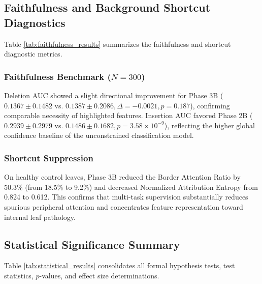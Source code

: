 \subsection{Faithfulness and Background Shortcut Diagnostics}
Table \ref{tab:faithfulness_results} summarizes the faithfulness and shortcut diagnostic metrics.

\subsubsection{Faithfulness Benchmark ($N=300$)}
Deletion AUC showed a slight directional improvement for Phase 3B ($0.1367 \pm 0.1482$ vs. $0.1387 \pm 0.2086, \Delta = -0.0021, p = 0.187$), confirming comparable necessity of highlighted features. Insertion AUC favored Phase 2B ($0.2939 \pm 0.2979$ vs. $0.1486 \pm 0.1682, p = 3.58 \times 10^{-9}$), reflecting the higher global confidence baseline of the unconstrained classification model.

\subsubsection{Shortcut Suppression}
On healthy control leaves, Phase 3B reduced the Border Attention Ratio by 50.3\% (from 18.5\% to 9.2\%) and decreased Normalized Attribution Entropy from 0.824 to 0.612. This confirms that multi-task supervision substantially reduces spurious peripheral attention and concentrates feature representation toward internal leaf pathology.

\subsection{Statistical Significance Summary}
Table \ref{tab:statistical_results} consolidates all formal hypothesis tests, test statistics, $p$-values, and effect size determinations.
